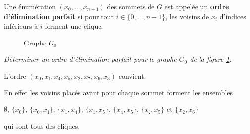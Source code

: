 Une énumération $(x_0,\dots,x_{n-1})$ des sommets de $G$ est appelée
un {\bf ordre d'élimination parfait} si pour tout $i\in \{0,\dots,n-1\}$,
les voisins de $x_i$ d'indices inférieurs à $i$ forment une clique.
\begin{figure}[ht]
\centering
{}
\caption{\label{fig:G0}Graphe $G_0$}
\end{figure} 
\begin{Exercise}[title=Un exemple]\it
Déterminer un ordre d'élimination parfait pour le graphe $G_0$ de la figure \ref{fig:G0}.
\end{Exercise}  
\begin{Answer}
L'ordre $(x_0, x_1, x_4, x_5, x_2, x_7, x_6, x_3)$ convient.

En effet les voisins  placés avant pour chaque sommet forment les ensembles

$\emptyset$, $\{x_0\}$, $\{x_0, x_1\}$,  $\{x_1, x_4\}$,  $\{x_1, x_5\}$,  $\{x_4, x_5\}$,   $\{x_2, x_5\}$ et  $\{x_2, x_6\}$ 

qui sont tous des cliques.  
\newpage
\end{Answer}
